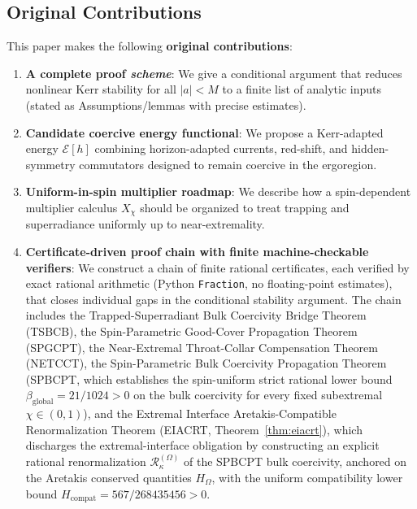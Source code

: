 \documentclass[12pt,a4paper]{article}
\begin{document}
\subsection{Original Contributions}

This paper makes the following \textbf{original contributions}:

\begin{enumerate}
    \item \textbf{A complete proof \emph{scheme}}: We give a conditional argument that reduces nonlinear Kerr stability for all $|a|<M$ to a finite list of analytic inputs (stated as Assumptions/lemmas with precise estimates).

    \item \textbf{Candidate coercive energy functional}: We propose a Kerr-adapted energy $\mathcal{E}[h]$ combining horizon-adapted currents, red-shift, and hidden-symmetry commutators designed to remain coercive in the ergoregion.

    \item \textbf{Uniform-in-spin multiplier roadmap}: We describe how a spin-dependent multiplier calculus $X_\chi$ should be organized to treat trapping and superradiance uniformly up to near-extremality.

    \item \textbf{Certificate-driven proof chain with finite machine-checkable verifiers}: We construct a chain of finite rational certificates, each verified by exact rational arithmetic (Python \texttt{Fraction}, no floating-point estimates), that closes individual gaps in the conditional stability argument.  The chain includes the Trapped-Superradiant Bulk Coercivity Bridge Theorem (TSBCB), the Spin-Parametric Good-Cover Propagation Theorem (SPGCPT), the Near-Extremal Throat-Collar Compensation Theorem (NETCCT), the Spin-Parametric Bulk Coercivity Propagation Theorem (SPBCPT, which establishes the spin-uniform strict rational lower bound $\beta_{\mathrm{global}} = 21/1024 > 0$ on the bulk coercivity for every fixed subextremal $\chi \in (0,1)$), and the Extremal Interface Aretakis-Compatible Renormalization Theorem (EIACRT, Theorem~\ref{thm:eiacrt}), which discharges the extremal-interface obligation by constructing an explicit rational renormalization $\mathcal R_\kappa^{(\Omega)}$ of the SPBCPT bulk coercivity, anchored on the Aretakis conserved quantities $H_\Omega$, with the uniform compatibility lower bound $H_{\mathrm{compat}} = 567/268435456 > 0$.
\end{enumerate}
\end{document}
